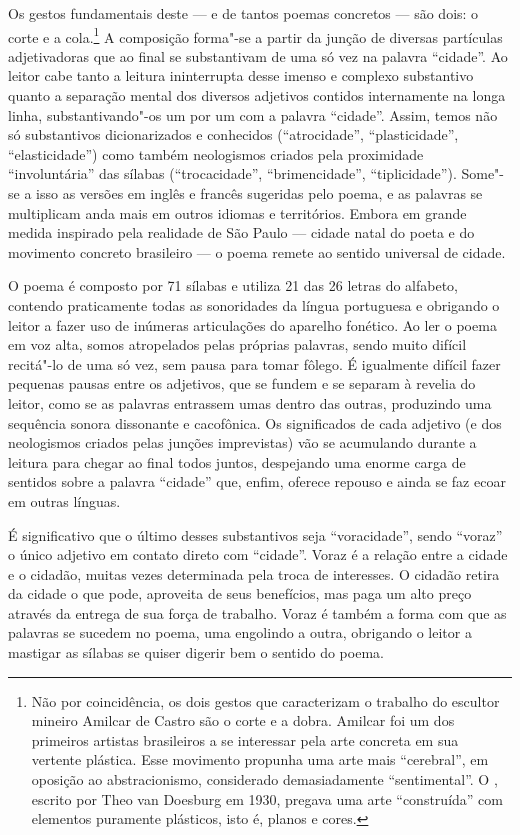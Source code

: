 Os gestos fundamentais deste --- e de tantos poemas concretos --- são
dois: o corte e a cola.\footnote{Não por coincidência, os dois gestos
  que caracterizam o trabalho do escultor mineiro Amilcar de Castro são
  o corte e a dobra. Amilcar foi um dos primeiros artistas brasileiros a
  se interessar pela arte concreta em sua vertente plástica. Esse
  movimento propunha uma arte mais ``cerebral'', em oposição ao
  abstracionismo, considerado demasiadamente ``sentimental''. O
  {}, escrito por Theo van Doesburg em 1930,
  pregava uma arte ``construída'' com elementos puramente plásticos,
  isto é, planos e cores.} A composição forma"-se a partir da junção de
diversas partículas adjetivadoras que ao final se substantivam de uma só
vez na palavra ``cidade''. Ao leitor cabe tanto a leitura ininterrupta
desse imenso e complexo substantivo quanto a separação mental dos
diversos adjetivos contidos internamente na longa linha,
substantivando"-os um por um com a palavra ``cidade''. Assim, temos não
só substantivos dicionarizados e conhecidos (``atrocidade'',
``plasticidade'', ``elasticidade'') como também neologismos criados pela
proximidade ``involuntária'' das sílabas (``trocacidade'',
``brimencidade'', ``tiplicidade''). Some"-se a isso as versões em inglês
e francês sugeridas pelo poema, e as palavras se multiplicam anda
mais em outros idiomas e territórios. Embora em grande medida inspirado
pela realidade de São Paulo --- cidade natal do poeta e do movimento
concreto brasileiro --- o poema remete ao sentido universal de cidade.

O poema é composto por 71 sílabas e utiliza 21 das 26 letras do
alfabeto, contendo praticamente todas as sonoridades da língua
portuguesa e obrigando o leitor a fazer uso de inúmeras articulações do
aparelho fonético. Ao ler o poema em voz alta, somos atropelados pelas
próprias palavras, sendo muito difícil recitá"-lo de uma só vez, sem
pausa para tomar fôlego. É igualmente difícil fazer pequenas pausas
entre os adjetivos, que se fundem e se separam à revelia do leitor, como
se as palavras entrassem umas dentro das outras, produzindo uma
sequência sonora dissonante e cacofônica. Os significados de cada
adjetivo (e dos neologismos criados pelas junções imprevistas) vão se
acumulando durante a leitura para chegar ao final todos juntos,
despejando uma enorme carga de sentidos sobre a palavra ``cidade'' que,
enfim, oferece repouso e ainda se faz ecoar em outras línguas.

É significativo que o último desses substantivos seja ``voracidade'',
sendo ``voraz'' o único adjetivo em contato direto com ``cidade''. Voraz
é a relação entre a cidade e o cidadão, muitas vezes determinada pela
troca de interesses. O cidadão retira da cidade o que pode, aproveita de
seus benefícios, mas paga um alto preço através da entrega de sua força
de trabalho. Voraz é também a forma com que as palavras se sucedem no
poema, uma engolindo a outra, obrigando o leitor a mastigar as sílabas
se quiser digerir bem o sentido do poema.

